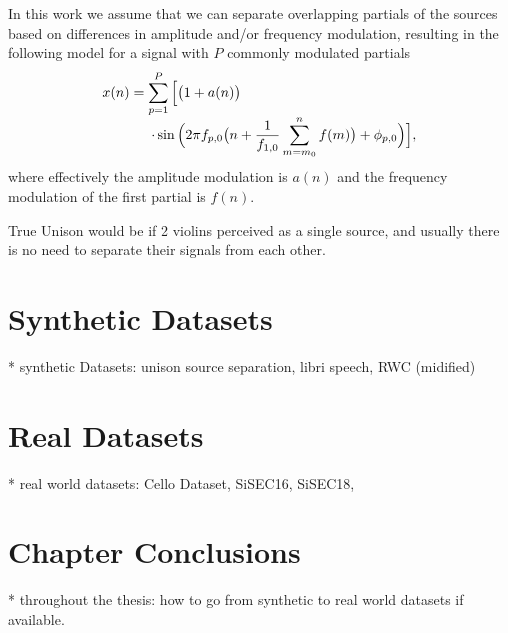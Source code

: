In this work we assume that we can separate overlapping partials of the sources based on differences in amplitude and/or frequency modulation, resulting in the following model for a signal with $P$ commonly modulated partials
\begin{equation}
  \begin{array}{l}
   x(n) = \displaystyle \sum_{p=1}^{P} \Big[\big(1 + a(n)\big) \\
   \hspace{3.5em}\displaystyle \cdot\sin \Big(2\pi f_{p,0}\big(n + \frac{1}{f_{1,0}} \sum_{m=m_0}^{n}{f(m)} \big) + \phi_{p,0} \Big)\Big] ,
  \end{array}
\end{equation}
where effectively the amplitude modulation is $a(n)$ and the frequency modulation of the first partial is $f(n)$.

True Unison would be if 2 violins perceived as a single source, and usually there is no need to separate their signals from each other.
\section{Synthetic Datasets}
* synthetic Datasets: unison source separation, libri speech, RWC (midified)
\section{Real Datasets}
* real world datasets: Cello Dataset, SiSEC16, SiSEC18,
\section{Chapter Conclusions}
* throughout the thesis: how to go from synthetic to real world datasets if available.

